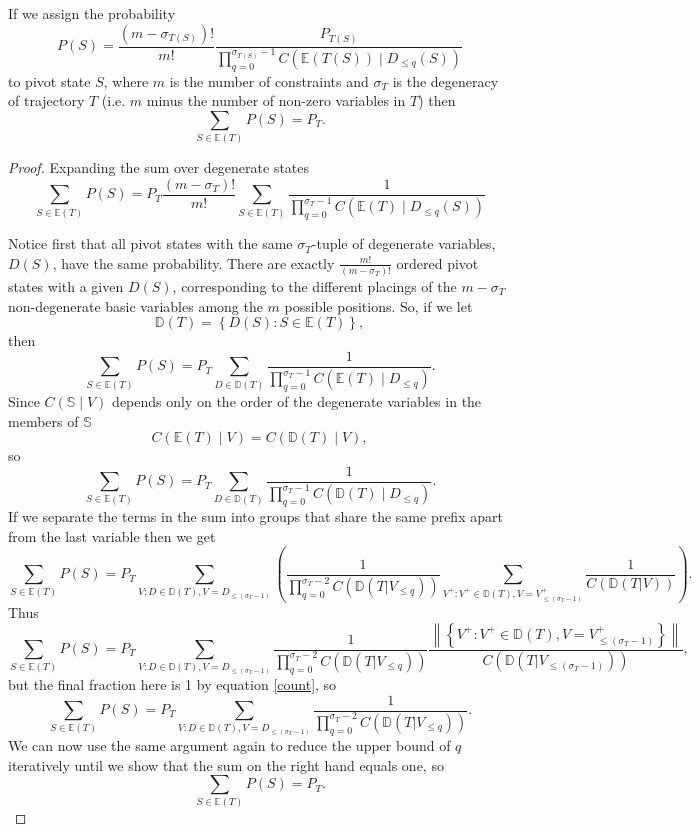 \begin{theorem}
If we assign the probability
\begin{equation}
P(S) =  \frac{(m-\sigma_{T(S)})!}{m!} \frac{P_{T(S)}}{\prod_{q=0}^{\sigma_{T(S)}-1} C(\mathbb{E}(T(S)) \mid D_{\le q}(S))}
\label{pivotProb}
\end{equation}
to pivot state $S$, where $m$ is the number of constraints and $\sigma_{T}$ is the degeneracy of trajectory $T$ (i.e. $m$ minus the number of non-zero variables in $T$) then
\[
\sum_{S \in \mathbb{E}(T)} P(S) = P_{T}.
\]
\end{theorem}
\begin{proof}
Expanding the sum over degenerate states
\[
\sum_{S \in \mathbb{E}(T)} P(S) =
P_T \frac{(m-\sigma_T)!}{m!} \sum_{S \in \mathbb{E}(T)} \frac{1}{\prod_{q=0}^{\sigma_T-1} C(\mathbb{E}(T) \mid D_{\le q}(S))}
\]

Notice first that all pivot states with the same $\sigma_T$-tuple of degenerate variables, $D(S)$, have the same probability. There are exactly $\frac{m!}{(m-\sigma_T)!}$ ordered pivot states with a given $D(S)$, corresponding to the different placings of the $m-\sigma_T$ non-degenerate basic variables among the $m$ possible positions. So, if we let
\[
\mathbb{D}(T) = \left\{ D(S) : S \in \mathbb{E}(T) \right\},
\]
then
\[
\sum_{S \in \mathbb{E}(T)} P(S) = P_T \sum_{D \in \mathbb{D}(T)} \frac{1}{\prod_{q=0}^{\sigma_T-1} C(\mathbb{E}(T) \mid D_{\le q})}.
\]
Since $C(\mathbb{S} \mid V)$ depends only on the order of the degenerate variables in the members of $\mathbb{S}$
\[
C(\mathbb{E}(T) \mid V) = C(\mathbb{D}(T) \mid V),
\]
so
\begin{equation}
\sum_{S \in \mathbb{E}(T)} P(S) = P_T \sum_{D \in \mathbb{D}(T)} \frac{1}{\prod_{q=0}^{\sigma_T-1} C(\mathbb{D}(T) \mid D_{\le q})}.
\label{normalForm}
\end{equation}
If we separate the terms in the sum into groups that share the same prefix apart from the last variable then we get
\[
\sum_{S \in \mathbb{E}(T)} P(S) = 
P_T \sum_{V : D \in \mathbb{D}(T), V = D_{\le (\sigma_T-1)}} 
\left(
\frac{1}{\prod_{q=0}^{\sigma_T-2} C(\mathbb{D}(T|V_{\le q}))}
\sum_{V^+: V^+ \in \mathbb{D}(T), V = V^+_{\le (\sigma_T-1)}}
\frac{1}{C(\mathbb{D}(T|V))}
\right).
\]
Thus
\[
\sum_{S \in \mathbb{E}(T)} P(S) = 
P_T \sum_{V : D \in \mathbb{D}(T), V = D_{\le (\sigma_T-1)}} 
\frac{1}{\prod_{q=0}^{\sigma_T-2} C(\mathbb{D}(T|V_{\le q}))}
\frac{\left\|\left\{V^+: V^+ \in \mathbb{D}(T), V = V^+_{\le (\sigma_T-1)}\right\}\right\|}{C(\mathbb{D}(T|V_{\le (\sigma_T-1)}))},
\]
but the final fraction here is 1 by equation \ref{count}, so
\[
\sum_{S \in \mathbb{E}(T)} P(S) = 
P_T \sum_{V : D \in \mathbb{D}(T), V = D_{\le (\sigma_T-1)}} 
\frac{1}{\prod_{q=0}^{\sigma_T-2} C(\mathbb{D}(T|V_{\le q}))}.
\]
We can now use the same argument again to reduce the upper bound of $q$ iteratively until we show that the sum on the right hand equals one, so
\[
\sum_{S \in \mathbb{E}(T)} P(S) = P_T.
\]
\end{proof}

